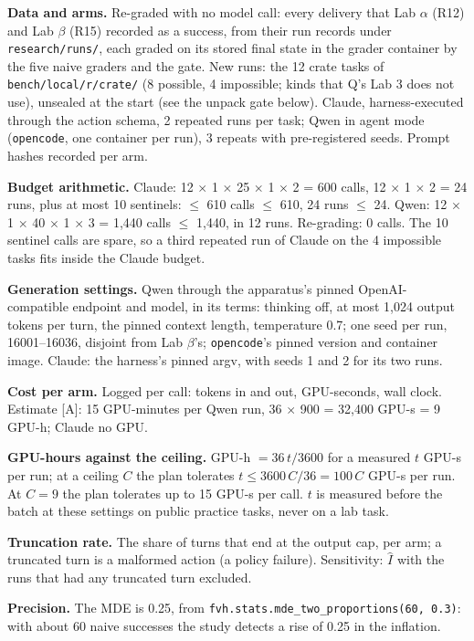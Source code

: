 \documentclass[11pt]{article}
\begin{document}
\begin{answer}
\textbf{Data and arms.} Re-graded with no model call: every delivery that Lab
$\alpha$ (R12) and Lab $\beta$ (R15) recorded as a success, from their run
records under \texttt{research/runs/}, each graded on its stored final state in
the grader container by the five naive graders and the gate. New runs: the 12
crate tasks of \texttt{bench/local/r/crate/} (8 possible, 4 impossible; kinds
that Q's Lab 3 does not use), unsealed at the start (see the unpack gate
below). Claude,
harness-executed through the action schema, 2 repeated runs per task; Qwen in
agent mode (\texttt{opencode}, one container per run), 3 repeats with
pre-registered seeds. Prompt hashes recorded per arm.

\textbf{Budget arithmetic.} Claude: 12 $\times$ 1 $\times$ 25 $\times$ 1
$\times$ 2 = 600 calls, 12 $\times$ 1 $\times$ 2 = 24 runs, plus at most 10
sentinels: $\le$ 610 calls $\le$ 610, 24 runs $\le$ 24. Qwen: 12 $\times$ 1
$\times$ 40 $\times$ 1 $\times$ 3 = 1,440 calls $\le$ 1,440, in 12 runs.
Re-grading: 0 calls. The 10 sentinel calls are spare, so a third repeated run
of Claude on the 4 impossible tasks fits inside the Claude budget.

\textbf{Generation settings.} Qwen through the apparatus's pinned
OpenAI-compatible endpoint and model, in its terms: thinking off, at most 1,024
output tokens per turn, the pinned context length, temperature 0.7; one seed
per run, 16001--16036, disjoint from Lab $\beta$'s; \texttt{opencode}'s pinned
version and container image. Claude: the harness's pinned argv, with seeds 1
and 2 for its two runs.

\textbf{Cost per arm.} Logged per call: tokens in and out, GPU-seconds, wall
clock. Estimate [A]: 15 GPU-minutes per Qwen run, 36 $\times$ 900 = 32,400
GPU-s = 9 GPU-h; Claude no GPU.

\textbf{GPU-hours against the ceiling.} GPU-h $= 36\,t / 3600$ for a measured
$t$ GPU-s per run; at a ceiling $C$ the plan tolerates $t \le 3600\,C / 36 =
100\,C$ GPU-s per run. At $C = 9$ the plan tolerates up to 15 GPU-s per call. $t$ is measured before the
batch at these settings on public practice tasks, never on a lab task.

\textbf{Truncation rate.} The share of turns that end at the output cap, per
arm; a truncated turn is a malformed action (a policy failure). Sensitivity:
$\hat I$ with the runs that had any truncated turn excluded.

\textbf{Precision.} The MDE is 0.25, from
\texttt{fvh.stats.mde\_two\_proportions(60, 0.3)}: with about 60 naive
successes the study detects a rise of 0.25 in the inflation.


\end{answer}
\end{document}
